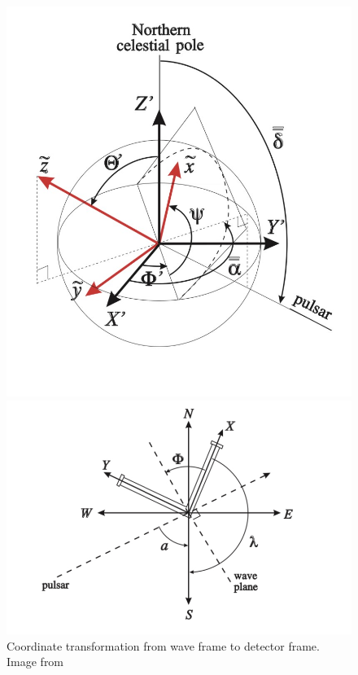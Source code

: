 \documentclass{ttuthes2007}
\begin{document}
\begin{figure}[h!]
  \centering
  \begin{minipage}{0.4\textwidth}
    \includegraphics[width=\textwidth]{figure/wavedetector.jpg}
  \end{minipage}
  \hfill
  \begin{minipage}{0.6\textwidth}
    \includegraphics[width=\textwidth]{figure/wavecelestial.jpg}
  \end{minipage}
  \caption{Coordinate transformation from wave frame to detector frame. Image
   from~\cite{1996A&A...312..675B}}
  \label{fig:Wavetodetector}
\end{figure}
\end{document}
